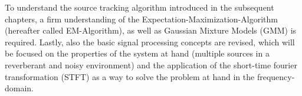 To understand the source tracking algorithm introduced in the subsequent chapters, a firm understanding of the Expectation-Maximization-Algorithm (hereafter called EM-Algorithm), as well as Gaussian Mixture Models (GMM) is required. Lastly, also the basic signal processing concepts are revised, which will be focused on the properties of the system at hand (multiple sources in a reverberant and noisy environment) and the application of the short-time fourier transformation (STFT) as a way to solve the problem at hand in the frequency-domain.